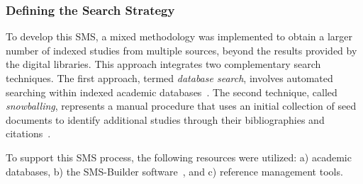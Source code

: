 \subsubsection{Defining the Search Strategy}\label{subsubsec:estrategia-busqueda}

To develop this SMS, a mixed  methodology was implemented to obtain a larger number of indexed studies from multiple sources, beyond the results provided by the digital libraries. This approach integrates two complementary search techniques. The first approach, termed \textit{database search}, involves automated searching within indexed academic databases~\cite{Jalai-01}. The second technique, called \textit{snowballing}, represents a manual procedure that uses an initial collection of seed documents to identify additional studies through their bibliographies and citations~\cite{Jalai-01,Goodman-01}.

To support this SMS process, the following resources were utilized: a) academic databases, b) the SMS-Builder software~\cite{Candela2022100935}, and c) reference management tools.
